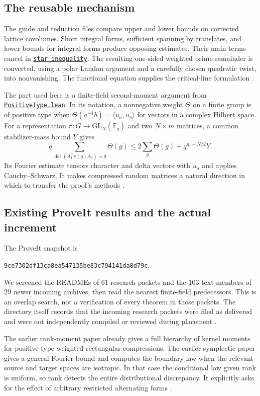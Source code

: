 \documentclass[11pt]{article}
\newcommand{\F}{\mathbb F_q}
\newcommand{\1}{\mathbf 1}
\newcommand{\src}[2]{\href{https://github.com/lsernau/grh-lean/blob/72fead102f663d5c7a407964a13dc0cf9d977207/#1}{#2}}
\theoremstyle{definition}
\theoremstyle{remark}
\numberwithin{equation}{section}
\begin{document}
\subsection{The reusable mechanism}
The guide and reduction files compare upper and lower bounds on corrected lattice covolumes. Short integral forms, sufficient spanning by translates, and lower bounds for integral forms produce opposing estimates. Their main terms cancel in \src{grh/src/New/Reduction/MainInequality.lean}{\texttt{star\_inequality}}. The resulting one-sided weighted prime remainder is converted, using a polar Landau argument and a carefully chosen quadratic twist, into nonvanishing. The functional equation supplies the critical-line formulation \cite{reduction}.

The part used here is a finite-field second-moment argument from
\src{grh/src/New/Spanning/SecondMoment/PositiveType.lean}{\texttt{PositiveType.lean}}. In its notation, a nonnegative weight $\Theta$ on a finite group is of positive type when
$\Theta(a^{-1}b)=\langle u_a,u_b\rangle$ for vectors in a complex Hilbert space. For a representation $\pi:G\to\mathrm{GL}_N(\F)$ and two $N\times m$ matrices, a common stabilizer-mass bound $Y$ gives
\[
q\sum_{\det(A_1^{\mathsf T}\pi(g)A_0)=0}\Theta(g)
\le 2\sum_g\Theta(g)+q^{m+N/2}Y.
\]
Its Fourier estimate tensors character and delta vectors with $u_a$ and applies Cauchy--Schwarz. It makes compressed random matrices a natural direction in which to transfer the proof's methods \cite{positive}.

\subsection{Existing ProveIt results and the actual increment}
The ProveIt snapshot is
\begin{center}\small\texttt{9ce7302df13ca8ea547135be83c794141da8d79c}.\end{center}
We screened the READMEs of 61 research packets and the 103 text members of 29 newer incoming archives, then read the nearest finite-field predecessors. This is an overlap search, not a verification of every theorem in those packets. The directory itself records that the incoming research packets were filed as delivered and were not independently compiled or reviewed during placement \cite{proveit}.

The earlier rank-moment paper already gives a full hierarchy of kernel moments for positive-type weighted rectangular compressions. The earlier symplectic paper gives a general Fourier bound and computes the boundary law when the relevant source and target spaces are isotropic. In that case the conditional law given rank is uniform, so rank detects the entire distributional discrepancy. It explicitly asks for the effect of arbitrary restricted alternating forms \cite{moments,symprior}.
\end{document}

